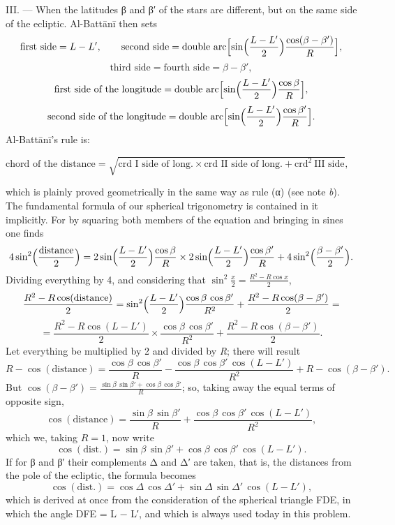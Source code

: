 \documentclass[11pt]{article}
\newcommand{\Pg}[1]{\marginpar{\footnotesize\color{gray}#1}}
\begin{document}
\par \Pg{I 203}III. — When the latitudes {\greekfont β} and {\greekfont β}′ of the stars are different, but on the same side of the ecliptic. Al-Battānī then sets \[ \text{first side} = L - L', \qquad \text{second side} = \text{double arc}\Bigl[\sin\Bigl(\frac{L - L'}{2}\Bigr)\frac{\cos(\beta - \beta')}{R}\Bigr], \] \[ \text{third side} = \text{fourth side} = \beta - \beta', \] \[ \text{first side of the longitude} = \text{double arc}\Bigl[\sin\Bigl(\frac{L - L'}{2}\Bigr)\frac{\cos\beta}{R}\Bigr], \] \[ \text{second side of the longitude} = \text{double arc}\Bigl[\sin\Bigl(\frac{L - L'}{2}\Bigr)\frac{\cos\beta'}{R}\Bigr]. \] Al-Battānī's rule is: \par\noindent\hspace*{1.5em}$\displaystyle \text{chord of the distance} = \sqrt{\text{crd I side of long.} \times \text{crd II side of long.} + \text{crd}^2\ \text{III side}},$\par which is plainly proved geometrically in the same way as rule ({\greekfont α}) (see note \emph{b}). The fundamental formula of our spherical trigonometry is contained in it implicitly. For by squaring both members of the equation and bringing in sines one finds \[ 4\sin^2\Bigl(\frac{\text{distance}}{2}\Bigr) = 2\sin\Bigl(\frac{L - L'}{2}\Bigr)\frac{\cos\beta}{R} \times 2\sin\Bigl(\frac{L - L'}{2}\Bigr)\frac{\cos\beta'}{R} + 4\sin^2\Bigl(\frac{\beta - \beta'}{2}\Bigr). \] Dividing everything by 4, and considering that $\sin^2\frac{x}{2} = \frac{R^2 - R\cos x}{2}$, \[ \frac{R^2 - R\cos(\text{distance})}{2} = \sin^2\Bigl(\frac{L - L'}{2}\Bigr)\frac{\cos\beta\,\cos\beta'}{R^2} + \frac{R^2 - R\cos(\beta - \beta')}{2} = \] \[ = \frac{R^2 - R\cos(L - L')}{2} \times \frac{\cos\beta\,\cos\beta'}{R^2} + \frac{R^2 - R\cos(\beta - \beta')}{2}. \] Let everything be multiplied by 2 and divided by \emph{R}; there will result \[ R - \cos(\text{distance}) = \frac{\cos\beta\,\cos\beta'}{R} - \frac{\cos\beta\,\cos\beta'\,\cos(L - L')}{R^2} + R - \cos(\beta - \beta'). \] But $\cos(\beta - \beta') = \frac{\sin\beta\,\sin\beta' + \cos\beta\,\cos\beta'}{R}$; so, taking away the equal terms of opposite sign, \[ \cos(\text{distance}) = \frac{\sin\beta\,\sin\beta'}{R} + \frac{\cos\beta\,\cos\beta'\,\cos(L - L')}{R^2}, \] which we, taking $R = 1$, now write \[ \cos(\text{dist.}) = \sin\beta\,\sin\beta' + \cos\beta\,\cos\beta'\,\cos(L - L'). \] If for {\greekfont β} and {\greekfont β}′ their complements {\greekfont Δ} and {\greekfont Δ}′ are taken, that is, the distances from the pole of the ecliptic, the formula becomes \[ \cos(\text{dist.}) = \cos\Delta\,\cos\Delta' + \sin\Delta\,\sin\Delta'\,\cos(L - L'), \] which is derived at once from the consideration of the spherical triangle FDE, in which the angle DFE = L − L′, and which is always used today in this problem.\par
\end{document}
